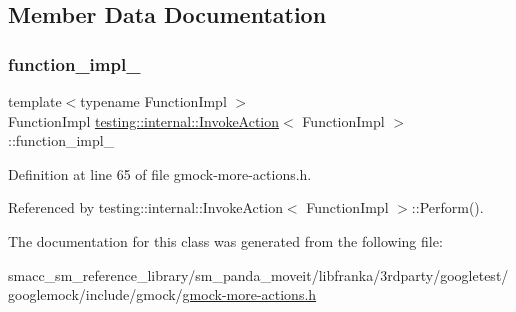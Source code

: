 \subsection{Member Data Documentation}
\mbox{\label{classtesting_1_1internal_1_1InvokeAction_afe2a9f6157cfd9c8b369987411f53337}} 
\subsubsection{\texorpdfstring{function\+\_\+impl\+\_\+}{function\_impl\_}}
{\footnotesize\ttfamily template$<$typename Function\+Impl $>$ \\
Function\+Impl \hyperlink{classtesting_1_1internal_1_1InvokeAction}{testing\+::internal\+::\+Invoke\+Action}$<$ Function\+Impl $>$\+::function\+\_\+impl\+\_\+\hspace{0.3cm}{\ttfamily [private]}}



Definition at line 65 of file gmock-\/more-\/actions.\+h.



Referenced by testing\+::internal\+::\+Invoke\+Action$<$ Function\+Impl $>$\+::\+Perform().



The documentation for this class was generated from the following file\+:\begin{DoxyCompactItemize}
\item 
smacc\+\_\+sm\+\_\+reference\+\_\+library/sm\+\_\+panda\+\_\+moveit/libfranka/3rdparty/googletest/googlemock/include/gmock/\hyperlink{gmock-more-actions_8h}{gmock-\/more-\/actions.\+h}\end{DoxyCompactItemize}
